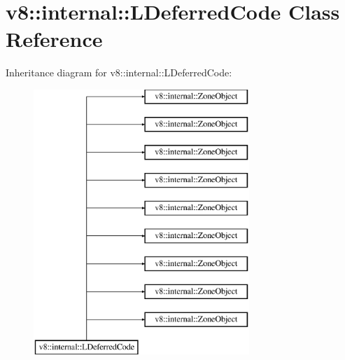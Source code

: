 \hypertarget{classv8_1_1internal_1_1_l_deferred_code}{}\section{v8\+:\+:internal\+:\+:L\+Deferred\+Code Class Reference}
\label{classv8_1_1internal_1_1_l_deferred_code}
Inheritance diagram for v8\+:\+:internal\+:\+:L\+Deferred\+Code\+:\begin{figure}[H]
\begin{center}
\leavevmode
\includegraphics[height=10.000000cm]{classv8_1_1internal_1_1_l_deferred_code}
\end{center}
\end{figure}
